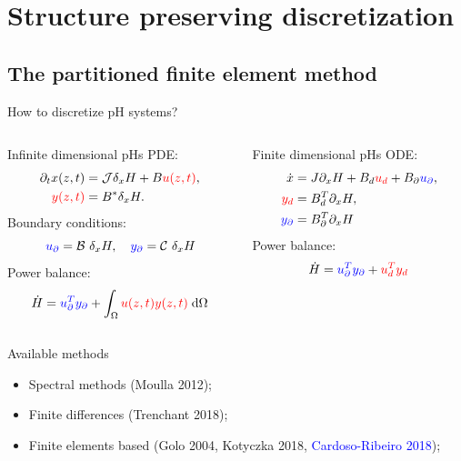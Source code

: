 \documentclass[aspectratio=169]{ISAE-Beamer}
\begin{document}
\section{Structure preserving discretization}

\subsection{The partitioned finite element method}

\begin{frame}{How to discretize pH systems?}
\begin{columns}[T]
	\setlength{\abovedisplayskip}{1pt}
	\setlength{\belowdisplayskip}{1pt}
	\begin{column}{.4\textwidth}
		\begin{block}{Infinite dimensional pHs}
			PDE:
			\begin{align*}
			\partial_t{x}(z, t) &= \mathcal{J} \delta_x {H} + B \textcolor{red}{u(z, t)}, \\
			\textcolor{red}{y(z, t)} &= B^* \delta_x {H}.
			\end{align*}
			Boundary conditions: 
			\[\textcolor{blue}{u_\partial} = \mathcal{B}\ \delta_x {H}, \quad \textcolor{blue}{y_\partial} = \mathcal{C}\ \delta_x {H} \]
			Power balance: 
			\[ \dot{H} = \displaystyle \textcolor{blue}{u_\partial^T y_\partial} +  \int_{\Omega} \textcolor{red}{u(z, t) y(z, t)} \d{\Omega}
			\]
		\end{block}
	\end{column}
	\begin{column}{.4\textwidth}
		\begin{block}{Finite dimensional pHs}
			ODE:
			\begin{align*}
			\dot{x} &= J \partial_x {H} + B_d \textcolor{red}{u_d} + B_\partial \textcolor{blue}{u_\partial}, \\
			\textcolor{red}{y_d} &= B_d^T \partial_x {H}, \\
			\textcolor{blue}{y_\partial} &= B_\partial^T \partial_x {H}
			\end{align*}
			Power balance: 
			\[ \dot{H} = \textcolor{blue}{u_\partial^T y_\partial} +  \textcolor{red}{u_d^T y_d}
			\]
		\end{block}
	\end{column}
\end{columns}
\begin{exampleblock}{Available methods}
	\begin{itemize}
		\item Spectral methods (Moulla 2012);
		\item Finite differences (Trenchant 2018);
		\item Finite elements based (Golo 2004, Kotyczka 2018, \textcolor{blue}{Cardoso-Ribeiro 2018});
	\end{itemize}
\end{exampleblock}
\end{frame}
\end{document}
